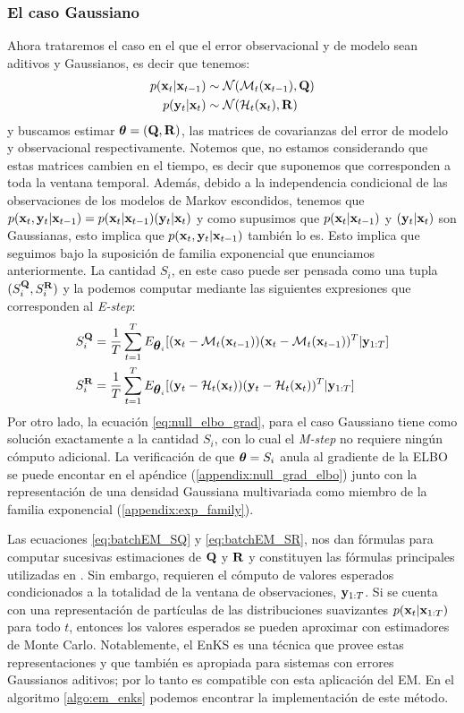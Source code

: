 \subsubsection*{El caso Gaussiano}
Ahora trataremos el caso en el que el error observacional y de modelo sean aditivos y Gaussianos, es decir que tenemos:
\begin{align}
    p(\mathbf{x}_t | \mathbf{x}_{t-1}) &\sim \mathcal{N}(\mathcal{M}_t(\mathbf{x}_{t-1}), \mathbf{Q}) \\
    p(\mathbf{y}_t | \mathbf{x}_t) &\sim \mathcal{N}(\mathcal{H}_t(\mathbf{x}_t), \mathbf{R})
\end{align}
y buscamos estimar $\mbox{\boldmath$ \theta $} = (\mathbf{Q}, \mathbf{R})$, las matrices de covarianzas del error de modelo y observacional respectivamente. Notemos que, no estamos considerando que estas matrices cambien en el tiempo, es decir que suponemos que corresponden a toda la ventana temporal. Además, debido a la independencia condicional de las observaciones de los modelos de Markov escondidos, tenemos que $p(\mathbf{x}_t, \mathbf{y}_t | \mathbf{x}_{t-1}) = p(\mathbf{x}_t | \mathbf{x}_{t-1}) (\mathbf{y}_t | \mathbf{x}_t)$ y como supusimos que $p(\mathbf{x}_t | \mathbf{x}_{t-1})$ y $(\mathbf{y}_t | \mathbf{x}_t)$ son Gaussianas, esto implica que $p(\mathbf{x}_t, \mathbf{y}_t | \mathbf{x}_{t-1})$ también lo es. Esto implica que seguimos bajo la suposición de familia exponencial que enunciamos anteriormente. La cantidad $S_i$, en este caso puede ser pensada como una tupla $(S_i^{\mathbf{Q}}, S_i^{\mathbf{R}})$ y la podemos computar mediante las siguientes expresiones que corresponden al \textit{E-step}:
\begin{align}
    S_i^{\mathbf{Q}} &= \frac{1}{T}\sum_{t=1}^T E_{\mbox{\boldmath$ \theta $}_i}[(\mathbf{x}_t - \mathcal{M}_t(\mathbf{x}_{t-1}))(\mathbf{x}_t - \mathcal{M}_t(\mathbf{x}_{t-1}))^T | \mathbf{y}_{1:T}] \label{eq:batchEM_SQ} \\
    S_i^{\mathbf{R}} &= \frac{1}{T}\sum_{t=1}^T E_{\mbox{\boldmath$ \theta $}_i}[(\mathbf{y}_t - \mathcal{H}_t(\mathbf{x}_t))(\mathbf{y}_t - \mathcal{H}_t(\mathbf{x}_t))^T | \mathbf{y}_{1:T}] \label{eq:batchEM_SR}
\end{align}
Por otro lado, la ecuación \ref{eq:null_elbo_grad}, para el caso Gaussiano tiene como solución exactamente a la cantidad $S_i$, con lo cual el \textit{M-step} no requiere ningún cómputo adicional. La verificación de que $\mbox{\boldmath$ \theta $} = S_i$ anula al gradiente de la ELBO se puede encontar en el apéndice (\ref{appendix:null_grad_elbo}) junto con la representación de una densidad Gaussiana multivariada como miembro de la familia exponencial (\ref{appendix:exp_family}).

Las ecuaciones \ref{eq:batchEM_SQ} y \ref{eq:batchEM_SR}, nos dan fórmulas para computar sucesivas estimaciones de $\mathbf{Q}$ y $\mathbf{R}$ y constituyen las fórmulas principales utilizadas en \cite{Dreano2017, Tandeo2015, Pulido2019}. Sin embargo, requieren el cómputo de valores esperados condicionados a la totalidad de la ventana de observaciones, $\mathbf{y}_{1:T}$. Si se cuenta con una representación de partículas de las distribuciones suavizantes $p(\mathbf{x}_t | \mathbf{x}_{1:T})$ para todo $t$, entonces los valores esperados se pueden aproximar con estimadores de Monte Carlo. Notablemente, el EnKS es una técnica que provee estas representaciones y que también es apropiada para sistemas con errores Gaussianos aditivos; por lo tanto es compatible con esta aplicación del EM. En el algoritmo \ref{algo:em_enks} podemos encontrar la implementación de este método.

